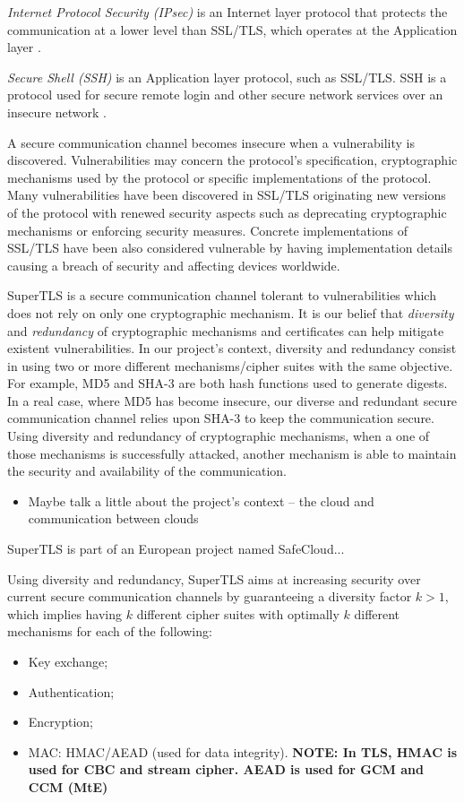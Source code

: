 \documentclass{sig-alternate-05-2015}
\begin{document}
\textit{Internet Protocol Security (IPsec)} is an Internet layer protocol that protects the communication at a lower level than SSL/TLS, which operates at the Application layer \cite{IPsec}.

\textit{Secure Shell (SSH)} is an Application layer protocol, such as SSL/TLS. SSH is a protocol used for secure remote login and other secure network services over an insecure network \cite{SSH}.

A secure communication channel becomes insecure when a vulnerability is discovered. Vulnerabilities may concern the protocol's specification, cryptographic mechanisms used by the protocol or specific implementations of the protocol. Many vulnerabilities have been discovered in SSL/TLS originating new versions of the protocol with renewed security aspects such as deprecating cryptographic mechanisms or enforcing security measures.
Concrete implementations of SSL/TLS have been also considered vulnerable by having implementation details causing a breach of security and affecting devices worldwide.

SuperTLS is a secure communication channel tolerant to vulnerabilities which does not rely on only one cryptographic mechanism. It is our belief that \textit{diversity} and \textit{redundancy} of cryptographic mechanisms and certificates can help mitigate existent vulnerabilities.
In our project's context, diversity and redundancy consist in using two or more different mechanisms/cipher suites with the same objective. For example, MD5 and SHA-3 are both hash functions used to generate digests. In a real case, where MD5 has become insecure, our diverse and redundant secure communication channel relies upon SHA-3 to keep the communication secure. Using diversity and redundancy of cryptographic mechanisms, when a one of those mechanisms is successfully attacked, another mechanism is able to maintain the security and availability of the communication.

\begin{itemize}
	\item Maybe talk a little about the project's context -- the cloud and communication between clouds
\end{itemize}

SuperTLS is part of an European project named SafeCloud...

Using diversity and redundancy, SuperTLS aims at increasing security over current secure communication channels by guaranteeing a diversity factor $k > 1$, which implies having $k$ different cipher suites with optimally $k$ different mechanisms for each of the following:
\begin{itemize}
\item Key exchange;
\item Authentication;
\item Encryption;
\item {MAC: HMAC/AEAD (used for data integrity). \textbf{NOTE: In TLS, HMAC is used for CBC and stream cipher. AEAD is used for GCM and CCM (MtE)}}
\end{itemize}
\end{document}
